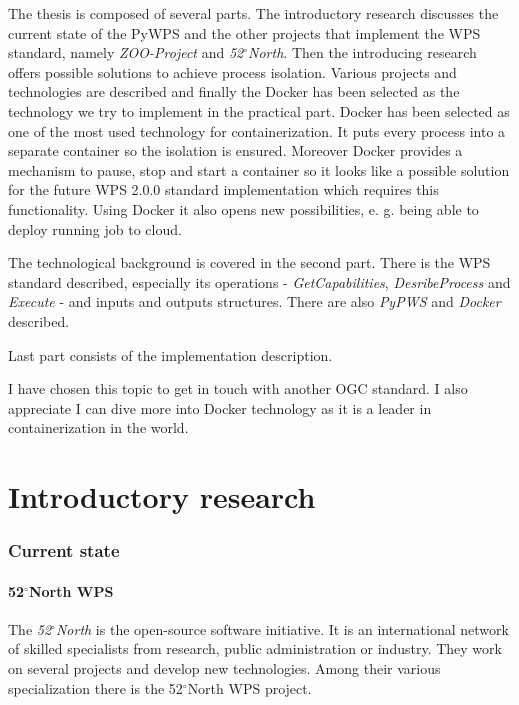 \documentclass[12pt,a4paper]{article}
\begin{document}
The thesis is composed of several parts. The introductory research discusses the current state of the PyWPS and the
other projects that implement the WPS standard, namely \textit{ZOO-Project} and \textit{52$^{\circ}$North}. Then the
introducing research offers possible solutions to achieve process isolation. Various projects and technologies are
described and finally the Docker has been selected as the technology we try to implement in the practical part. Docker
has been selected as one of the most used technology for containerization. It puts every process into a separate
container so the isolation is ensured. Moreover Docker provides a mechanism to pause, stop and start a container so it
looks like a possible solution for the future WPS 2.0.0 standard implementation which requires this functionality. Using
Docker it also opens new possibilities, e. g. being able to deploy running job to cloud.

The technological background is covered in the second part. There is the WPS standard described, especially its operations
- \textit{GetCapabilities}, \textit{DesribeProcess} and \textit{Execute} - and inputs and outputs structures. There are also
\textit{PyPWS} and \textit{Docker} described.

Last part consists of the implementation description.

I have chosen this topic to get in touch with another OGC standard. I also appreciate I can dive more into Docker technology
as it is a leader in containerization in the world.

\newpage
\part{Introductory research}

\newpage
\section{Current state}
\subsection{52$^{\circ}$North WPS}
The \textit{52$^{\circ}$North} is the open-source software initiative. It is an international network of skilled specialists from research,
public administration or industry. They work on several projects and develop new technologies. Among their various specialization there is 
the 52$^{\circ}$North WPS project.
\end{document}
